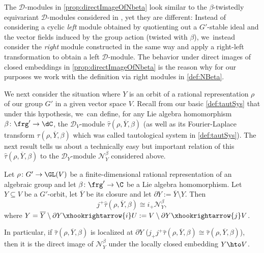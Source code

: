 The $\mathscr{D}$\nobreakdash-mod\-ules in \cref{prop:directImageOfNbeta} look similar to the $\beta$-twistedly equivariant $\mathscr{D}$\nobreakdash-mod\-ules considered in \cite[II.2]{Hot98}, yet they are different: Instead of considering a cyclic \emph{left} module obtained by quotienting out a $G'$-stable ideal and the vector fields induced by the group action (twisted with $\beta$), we~instead consider the \emph{right} module constructed in the same way and apply a right-left transformation to obtain a left $\mathscr{D}$\nobreakdash-mod\-ule. The behavior under direct images of closed embeddings in \cref{prop:directImageOfNbeta} is the reason why for our purposes we work with the definition via right modules in \cref{def:NBeta}.

We next consider the situation where $Y$ is an orbit
of a rational representation $\rho$ of our group $G'$ in a given vector space $V$. Recall from our basic \cref{def:tautSys} that under this hypothesis, we~can define, for any Lie algebra homomorphism $\beta\colon \frg'\to \dC$, the $\mathscr{D}_V$\nobreakdash-mod\-ule $\hat{\tau}(\rho, \overline{Y},\beta)$ (as well as its Fourier-Laplace transform $\tau(\rho, \overline{Y},\beta)$ which was called tautological system in \cref{def:tautSys}). The next result tells us about a technically easy but important relation of this $\hat{\tau}(\rho, \overline{Y},\beta)$ to the $\mathscr{D}_Y$\nobreakdash-mod\-ule $\mathscr{N}_Y^\beta$ considered above.

\begin{cor} \label{cor:FLTautSysAsDirectImage}
Let $\rho \colon G' \to \GL(V)$ be a finite-dimensional rational representation of an algebraic group and let $\beta \colon \frg' \to \C$ be a Lie algebra homomorphism. Let $Y \subseteq V$ be a $G'$-orbit, let $\overline{Y}$ be its closure and let $\partial Y := \overline Y \setminus Y$.
Then
\[
j^+ \hat{\tau}(\rho, \overline{Y}, \beta) \cong i_+ \mathscr{N}_{Y}^{\beta},
\]
where $Y = \overline Y \setminus \partial Y \xhookrightarrow{i} U:=V \setminus \partial Y \xhookrightarrow{j} V$.

In particular, if $\hat{\tau}(\rho, \overline{Y}, \beta)$ is localized at $\partial Y$ (\ie $j_+ j^+ \hat{\tau}(\rho,\overline{Y},\beta) \cong \hat{\tau}(\rho,\overline{Y},\beta)$), then it is the direct image of $\mathscr{N}_{Y}^{\beta}$ under the locally closed embedding $Y \hto V$.
\end{cor}

